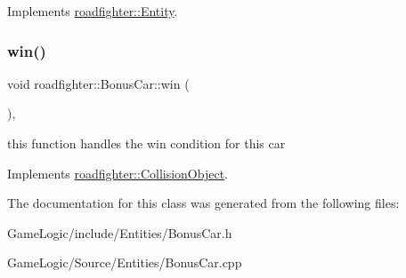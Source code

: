 Implements \hyperlink{classroadfighter_1_1Entity_a66614a11004d6f9516473f60b530f689}{roadfighter\+::\+Entity}.

\mbox{\label{classroadfighter_1_1BonusCar_afb2d142de799694db896ba875d7d0c27}} 
\subsubsection{\texorpdfstring{win()}{win()}}
{\footnotesize\ttfamily void roadfighter\+::\+Bonus\+Car\+::win (\begin{DoxyParamCaption}{ }\end{DoxyParamCaption})\hspace{0.3cm}{\ttfamily [override]}, {\ttfamily [virtual]}}

this function handles the win condition for this car 

Implements \hyperlink{classroadfighter_1_1CollisionObject_a03ce1ae52676088839d85c597743052c}{roadfighter\+::\+Collision\+Object}.



The documentation for this class was generated from the following files\+:\begin{DoxyCompactItemize}
\item 
Game\+Logic/include/\+Entities/Bonus\+Car.\+h\item 
Game\+Logic/\+Source/\+Entities/Bonus\+Car.\+cpp\end{DoxyCompactItemize}
